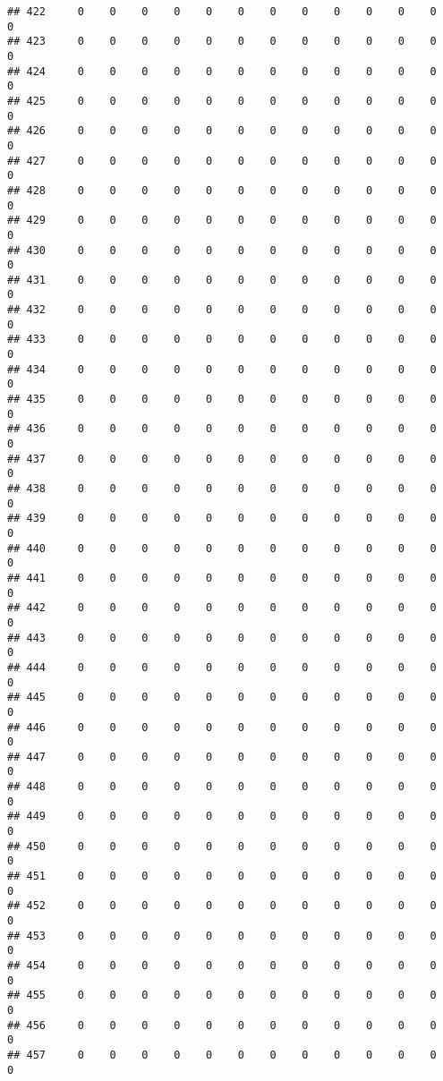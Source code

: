 \documentclass[]{article}
\begin{document}
\begin{verbatim}
## 422     0    0    0    0    0    0    0    0    0    0    0    0    0
## 423     0    0    0    0    0    0    0    0    0    0    0    0    0
## 424     0    0    0    0    0    0    0    0    0    0    0    0    0
## 425     0    0    0    0    0    0    0    0    0    0    0    0    0
## 426     0    0    0    0    0    0    0    0    0    0    0    0    0
## 427     0    0    0    0    0    0    0    0    0    0    0    0    0
## 428     0    0    0    0    0    0    0    0    0    0    0    0    0
## 429     0    0    0    0    0    0    0    0    0    0    0    0    0
## 430     0    0    0    0    0    0    0    0    0    0    0    0    0
## 431     0    0    0    0    0    0    0    0    0    0    0    0    0
## 432     0    0    0    0    0    0    0    0    0    0    0    0    0
## 433     0    0    0    0    0    0    0    0    0    0    0    0    0
## 434     0    0    0    0    0    0    0    0    0    0    0    0    0
## 435     0    0    0    0    0    0    0    0    0    0    0    0    0
## 436     0    0    0    0    0    0    0    0    0    0    0    0    0
## 437     0    0    0    0    0    0    0    0    0    0    0    0    0
## 438     0    0    0    0    0    0    0    0    0    0    0    0    0
## 439     0    0    0    0    0    0    0    0    0    0    0    0    0
## 440     0    0    0    0    0    0    0    0    0    0    0    0    0
## 441     0    0    0    0    0    0    0    0    0    0    0    0    0
## 442     0    0    0    0    0    0    0    0    0    0    0    0    0
## 443     0    0    0    0    0    0    0    0    0    0    0    0    0
## 444     0    0    0    0    0    0    0    0    0    0    0    0    0
## 445     0    0    0    0    0    0    0    0    0    0    0    0    0
## 446     0    0    0    0    0    0    0    0    0    0    0    0    0
## 447     0    0    0    0    0    0    0    0    0    0    0    0    0
## 448     0    0    0    0    0    0    0    0    0    0    0    0    0
## 449     0    0    0    0    0    0    0    0    0    0    0    0    0
## 450     0    0    0    0    0    0    0    0    0    0    0    0    0
## 451     0    0    0    0    0    0    0    0    0    0    0    0    0
## 452     0    0    0    0    0    0    0    0    0    0    0    0    0
## 453     0    0    0    0    0    0    0    0    0    0    0    0    0
## 454     0    0    0    0    0    0    0    0    0    0    0    0    0
## 455     0    0    0    0    0    0    0    0    0    0    0    0    0
## 456     0    0    0    0    0    0    0    0    0    0    0    0    0
## 457     0    0    0    0    0    0    0    0    0    0    0    0    0

\end{verbatim}
\end{document}
